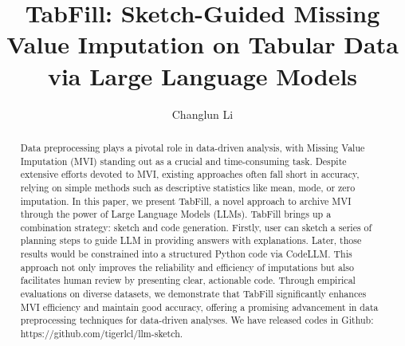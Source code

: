 \documentclass[sigconf]{acmart}
\begin{document}
\title{TabFill: Sketch-Guided Missing Value Imputation on Tabular Data via Large Language Models}


\author{Changlun Li}



\begin{abstract}
Data preprocessing plays a pivotal role in data-driven analysis, with Missing Value Imputation (MVI) standing out as a crucial and time-consuming task. Despite extensive efforts devoted to MVI, existing approaches often fall short in accuracy, relying on simple methods such as descriptive statistics like mean, mode, or zero imputation. In this paper, we present TabFill, a novel approach to archive MVI through the power of Large Language Models (LLMs). TabFill brings up a combination strategy: sketch and code generation. Firstly, user can sketch a series of planning steps to guide LLM in providing answers with explanations. Later, those results would be constrained into a structured Python code via CodeLLM. This approach not only improves the reliability and efficiency of imputations but also facilitates human review by presenting clear, actionable code. Through empirical evaluations on diverse datasets, we demonstrate that TabFill significantly enhances MVI efficiency and maintain good accuracy, offering a promising advancement in data preprocessing techniques for data-driven analyses. We have released codes in Github: https://github.com/tigerlcl/llm-sketch.
\end{abstract}




\maketitle
\end{document}
